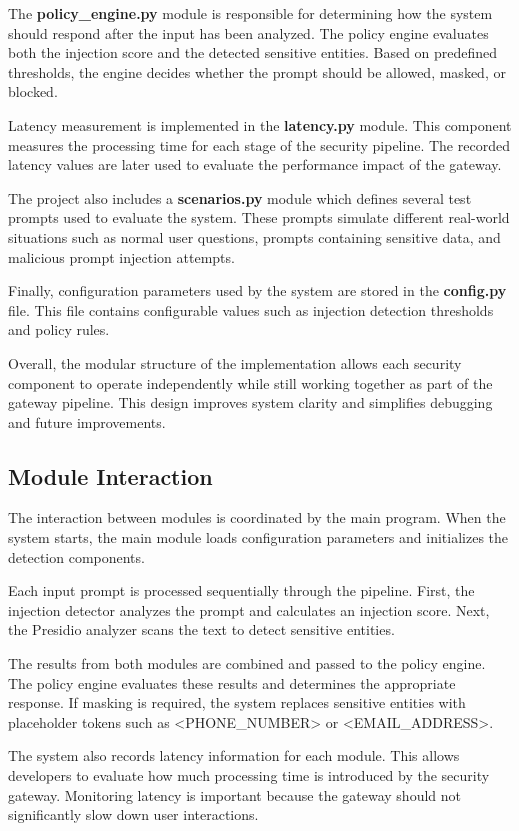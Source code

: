 \documentclass[conference]{IEEEtran}
\begin{document}
The \textbf{policy\_engine.py} module is responsible for determining how the system should respond after the input has been analyzed. The policy engine evaluates both the injection score and the detected sensitive entities. Based on predefined thresholds, the engine decides whether the prompt should be allowed, masked, or blocked.

Latency measurement is implemented in the \textbf{latency.py} module. This component measures the processing time for each stage of the security pipeline. The recorded latency values are later used to evaluate the performance impact of the gateway.

The project also includes a \textbf{scenarios.py} module which defines several test prompts used to evaluate the system. These prompts simulate different real-world situations such as normal user questions, prompts containing sensitive data, and malicious prompt injection attempts.

Finally, configuration parameters used by the system are stored in the \textbf{config.py} file. This file contains configurable values such as injection detection thresholds and policy rules.

Overall, the modular structure of the implementation allows each security component to operate independently while still working together as part of the gateway pipeline. This design improves system clarity and simplifies debugging and future improvements.

\subsection{Module Interaction}

The interaction between modules is coordinated by the main program. When the system starts, the main module loads configuration parameters and initializes the detection components.

Each input prompt is processed sequentially through the pipeline. First, the injection detector analyzes the prompt and calculates an injection score. Next, the Presidio analyzer scans the text to detect sensitive entities.

The results from both modules are combined and passed to the policy engine. The policy engine evaluates these results and determines the appropriate response. If masking is required, the system replaces sensitive entities with placeholder tokens such as <PHONE_NUMBER> or <EMAIL_ADDRESS>.

The system also records latency information for each module. This allows developers to evaluate how much processing time is introduced by the security gateway. Monitoring latency is important because the gateway should not significantly slow down user interactions.
\end{document}
